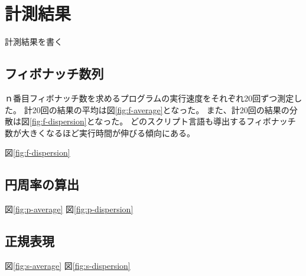 \chapter{計測結果}
\label{cha:result}
計測結果を書く
\section{フィボナッチ数列}
ｎ番目フィボナッチ数を求めるプログラムの実行速度をそれぞれ20回ずつ測定した。
計20回の結果の平均は図\ref{fig:f-average}となった。
また、計20回の結果の分散は図\ref{fig:f-dispersion}となった。
どのスクリプト言語も導出するフィボナッチ数が大きくなるほど実行時間が伸びる傾向にある。

図\ref{fig:f-dispersion}

\section{円周率の算出}
図\ref{fig:p-average}
図\ref{fig:p-dispersion}


\section{正規表現}
図\ref{fig:s-average}
図\ref{fig:s-dispersion}

